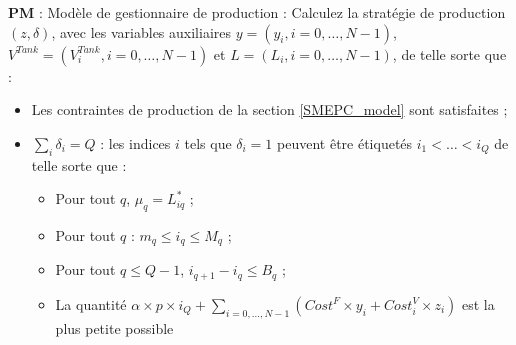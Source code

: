 \textbf{PM} : Modèle de gestionnaire de production : Calculez la stratégie de production $(z,\delta )$, avec les variables auxiliaires $y = (y_i, i = 0,\dots, N - 1)$, $V^{Tank} = (V^{Tank}_i, i = 0, \dots, N - 1)$ et $L = (L_i, i = 0, \dots, N - 1)$, de telle sorte que :
\begin{itemize}[label=$\square$]
	
	\item Les contraintes de production de la section \ref{SMEPC_model} sont satisfaites ;
	\item  $\sum_i \delta_i = Q$ : les indices $i$ tels que $\delta_i = 1$ peuvent être étiquetés $i_1< \dots< i_Q$ de telle sorte que :
	\begin{itemize}
		\item Pour tout $q$, $\mu_q = L_{iq}^*$ ;
		\item Pour tout $q$ : $m_q \leq i_q \leq M_q $ ;
		\item Pour tout $q \leq Q - 1$, $i_{q+1} - i_q \leq B_q$ ; 
		\item La quantité $\alpha \times p \times i_Q + \sum_{i = 0, \dots, N -1} (Cost^F\times y_i + Cost^V_i \times z_i)$ est la plus petite possible
	\end{itemize}
\end{itemize}

	
